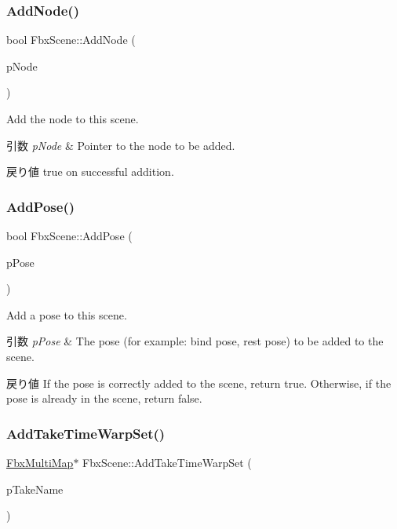 \subsubsection{\texorpdfstring{Add\+Node()}{AddNode()}}
{\footnotesize\ttfamily bool Fbx\+Scene\+::\+Add\+Node (\begin{DoxyParamCaption}\item[{\hyperlink{class_fbx_node}{Fbx\+Node} $\ast$}]{p\+Node }\end{DoxyParamCaption})}

Add the node to this scene. 
\begin{DoxyParams}{引数}
{\em p\+Node} & Pointer to the node to be added. \\
\hline
\end{DoxyParams}
\begin{DoxyReturn}{戻り値}
true on successful addition. 
\end{DoxyReturn}
\mbox{\label{class_fbx_scene_a41080e786745c1ebdc1c86a80a8e7961}} 
\subsubsection{\texorpdfstring{Add\+Pose()}{AddPose()}}
{\footnotesize\ttfamily bool Fbx\+Scene\+::\+Add\+Pose (\begin{DoxyParamCaption}\item[{\hyperlink{class_fbx_pose}{Fbx\+Pose} $\ast$}]{p\+Pose }\end{DoxyParamCaption})}

Add a pose to this scene. 
\begin{DoxyParams}{引数}
{\em p\+Pose} & The pose (for example\+: bind pose, rest pose) to be added to the scene. \\
\hline
\end{DoxyParams}
\begin{DoxyReturn}{戻り値}
If the pose is correctly added to the scene, return {\ttfamily true}. Otherwise, if the pose is already in the scene, return {\ttfamily false}. 
\end{DoxyReturn}
\mbox{\label{class_fbx_scene_aef596fedc76d369a7912ef107ee24113}} 
\subsubsection{\texorpdfstring{Add\+Take\+Time\+Warp\+Set()}{AddTakeTimeWarpSet()}}
{\footnotesize\ttfamily \hyperlink{class_fbx_multi_map}{Fbx\+Multi\+Map}$\ast$ Fbx\+Scene\+::\+Add\+Take\+Time\+Warp\+Set (\begin{DoxyParamCaption}\item[{char $\ast$}]{p\+Take\+Name }\end{DoxyParamCaption})}

